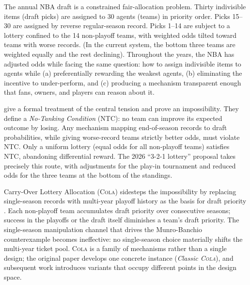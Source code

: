 \documentclass{article}
\newcommand{\cola}{\textup{\textsc{Cola}}}
\begin{document}
The annual NBA draft is a constrained fair-allocation problem. Thirty indivisible items (draft picks) are assigned to 30 agents (teams) in priority order. Picks 15--30 are assigned by reverse regular-season record. Picks 1--14 are subject to a lottery confined to the 14 non-playoff teams, with weighted odds tilted toward teams with worse records. (In the current system, the bottom three teams are weighted equally and the rest declining). Throughout the years, the NBA has adjusted odds while facing the same question: how to assign indivisible items to agents while (a) preferentially rewarding the weakest agents, (b) eliminating the incentive to under-perform, and (c) producing a mechanism transparent enough that fans, owners, and players can reason about it.

\citet{munro2020notanking} give a formal treatment of the central tension and prove an impossibility. They define a \emph{No-Tanking Condition} (NTC): no team can improve its expected outcome by losing. Any mechanism mapping end-of-season records to draft probabilities, while giving worse-record teams strictly better odds, must violate NTC. Only a uniform lottery (equal odds for all non-playoff teams) satisfies NTC, abandoning differential reward. The 2026 ``3-2-1 lottery'' proposal takes precisely this route, with adjustments for the play-in tournament and reduced odds for the three teams at the bottom of the standings\citep{highley2026solvable5}.

Carry-Over Lottery Allocation (\cola{}) sidesteps the impossibility by replacing single-season records with multi-year playoff history as the basis for draft priority \citep{highley2026cola}. Each non-playoff team accumulates draft priority over consecutive seasons; success in the playoffs or the draft itself diminishes a team's draft priority. The single-season manipulation channel that drives the Munro-Banchio counterexample becomes ineffective: no single-season choice materially shifts the multi-year ticket pool. \cola{} is a family of mechanisms rather than a single design; the original paper develops one concrete instance (\emph{Classic \cola{}}), and subsequent work introduces variants that occupy different points in the design space.
\end{document}
